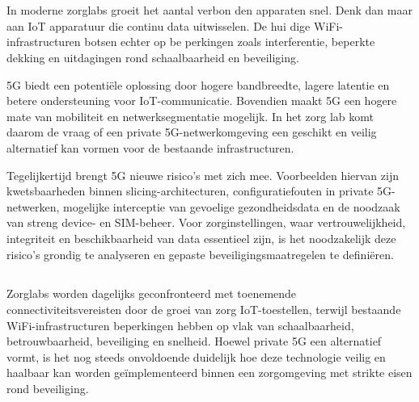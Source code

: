 
\chapter{}%
\label{ch:inleiding}

In moderne zorglabs groeit het aantal verbon den apparaten snel. Denk dan maar aan IoT apparatuur die continu data uitwisselen. De hui dige WiFi-infrastructuren botsen echter op be perkingen zoals interferentie, beperkte dekking en uitdagingen rond schaalbaarheid en beveiliging.
\vspace{0.5cm}

5G biedt een potentiële oplossing door hogere bandbreedte, lagere latentie en betere ondersteuning voor IoT-communicatie. Bovendien maakt 5G een hogere mate van mobiliteit en netwerksegmentatie mogelijk. In het zorg lab komt daarom de vraag of een private 5G-netwerkomgeving een geschikt en veilig alternatief kan vormen voor de bestaande infrastructuren.
\vspace{0.5cm}

Tegelijkertijd brengt 5G nieuwe risico’s met zich mee. Voorbeelden hiervan zijn kwetsbaarheden binnen slicing-architecturen, configuratiefouten in private 5G-netwerken, mogelijke interceptie van gevoelige gezondheidsdata en de noodzaak van streng device- en SIM-beheer. Voor zorginstellingen, waar vertrouwelijkheid, integriteit en beschikbaarheid van data essentieel zijn, is het noodzakelijk deze risico’s grondig te analyseren en gepaste beveiligingsmaatregelen te definiëren.


\section{}%
\label{sec:probleemstelling}

Zorglabs worden dagelijks geconfronteerd met toenemende connectiviteitsvereisten door de groei van zorg  IoT-toestellen, terwijl bestaande WiFi-infrastructuren beperkingen hebben op vlak van schaalbaarheid, betrouwbaarheid, beveiliging en snelheid. Hoewel private 5G een alternatief vormt, is het nog steeds onvoldoende duidelijk hoe deze technologie veilig en haalbaar kan worden geïmplementeerd binnen een zorgomgeving met strikte eisen rond beveiliging.


